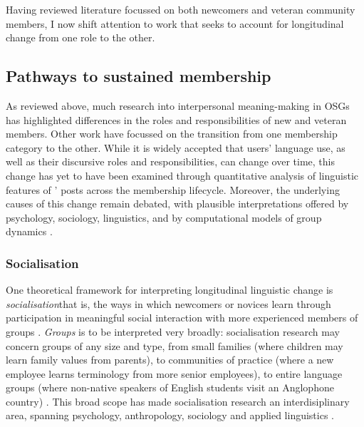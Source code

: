Having reviewed literature focussed on both newcomers and veteran community members, I now shift attention to work that seeks to account for longitudinal change from one role to the other.

\subsection{Pathways to sustained membership}

As reviewed above, much research into interpersonal meaning\hyp{}making in \glspl{OSG} has highlighted differences in the roles and responsibilities of new and veteran members. Other work have focussed on the transition from one membership category to the other. While it is widely accepted that users' language use, as well as their discursive roles and responsibilities, can change over time, this change has yet to have been examined through quantitative analysis of linguistic features of ' \glspl{post} across the membership lifecycle. Moreover, the underlying causes of this change remain debated, with plausible interpretations offered by psychology, sociology, linguistics, and by computational models of group dynamics \cite{kouper_pragmatics_2010,preece_online_2005}.

\subsubsection{Socialisation}

One theoretical framework for interpreting longitudinal linguistic change is \emph{socialisation}\textemdash{}that is, the ways in which newcomers or novices learn through participation in meaningful social interaction with more experienced \glspl{member} of groups \cite{ochs_socialization_1991}. \emph{Groups} is to be interpreted very broadly: socialisation research may concern groups of any size and type, from small families (where children may learn family values from parents), to communities of practice (where a new employee learns terminology from more senior employees), to entire language groups (where non\hyp{}native speakers of English students visit an Anglophone country) \cite{schieffelin_language_1986}. This broad scope has made socialisation research an interdisiplinary area, spanning psychology, anthropology, sociology and applied linguistics \cite[p.~172]{duff_language_2010}.

